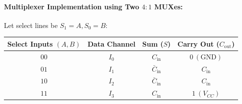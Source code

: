 \documentclass[11pt,a4paper,oneside]{book}
\begin{document}
\paragraph{Multiplexer Implementation using Two $4:1$ MUXes:}
Let select lines be $S_1 = A, S_0 = B$:
\begin{center}
\begin{tabular}{|c|c|c|c|}
\hline
\textbf{Select Inputs} $(A, B)$ & \textbf{Data Channel} & \textbf{Sum ($S$)} & \textbf{Carry Out ($C_{\text{out}}$)} \\ \hline
$00$ & $I_0$ & $C_{\text{in}}$ & $0\ (\text{GND})$ \\ \hline
$01$ & $I_1$ & $\bar{C}_{\text{in}}$ & $C_{\text{in}}$ \\ \hline
$10$ & $I_2$ & $\bar{C}_{\text{in}}$ & $C_{\text{in}}$ \\ \hline
$11$ & $I_3$ & $C_{\text{in}}$ & $1\ (V_{CC})$ \\ \hline
\end{tabular}
\end{center}
\end{document}
